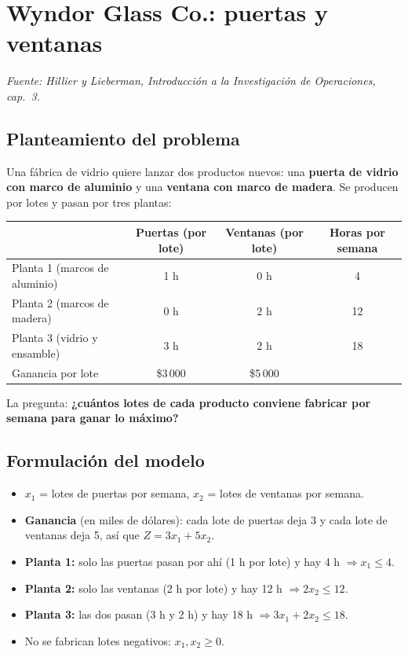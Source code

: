 \documentclass[11pt,a4paper]{article}
\begin{document}
\section{Wyndor Glass Co.: puertas y ventanas}
\textit{Fuente: Hillier y Lieberman, Introducción a la Investigación de Operaciones, cap.~3.}

\subsection*{Planteamiento del problema}
Una fábrica de vidrio quiere lanzar dos productos nuevos: una \textbf{puerta de vidrio con marco de aluminio}
y una \textbf{ventana con marco de madera}. Se producen por lotes y pasan por tres plantas:

\begin{center}\small
\begin{tabular}{lccc}
\toprule
 & \textbf{Puertas} (por lote) & \textbf{Ventanas} (por lote) & \textbf{Horas por semana} \\
\midrule
Planta 1 (marcos de aluminio) & 1 h & 0 h & 4 \\
Planta 2 (marcos de madera)   & 0 h & 2 h & 12 \\
Planta 3 (vidrio y ensamble)  & 3 h & 2 h & 18 \\
\midrule
Ganancia por lote & \$3\,000 & \$5\,000 & \\
\bottomrule
\end{tabular}
\end{center}

La pregunta: \textbf{¿cuántos lotes de cada producto conviene fabricar por semana para ganar lo máximo?}

\subsection*{Formulación del modelo}
\begin{itemize}[itemsep=2pt]
  \item $x_1$ = lotes de puertas por semana, \quad $x_2$ = lotes de ventanas por semana.
  \item \textbf{Ganancia} (en miles de dólares): cada lote de puertas deja 3 y cada lote de ventanas deja 5, así que
        $Z = 3x_1 + 5x_2$.
  \item \textbf{Planta 1:} solo las puertas pasan por ahí (1 h por lote) y hay 4 h $\Rightarrow x_1 \le 4$.
  \item \textbf{Planta 2:} solo las ventanas (2 h por lote) y hay 12 h $\Rightarrow 2x_2 \le 12$.
  \item \textbf{Planta 3:} las dos pasan (3 h y 2 h) y hay 18 h $\Rightarrow 3x_1 + 2x_2 \le 18$.
  \item No se fabrican lotes negativos: $x_1, x_2 \ge 0$.
\end{itemize}
\end{document}

